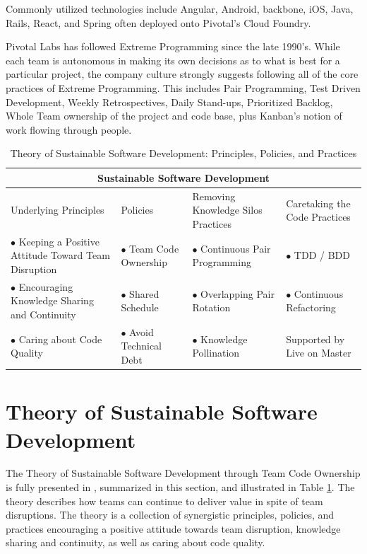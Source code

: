 Commonly utilized technologies include Angular, Android, backbone, iOS, Java, Rails, React, and Spring often deployed onto Pivotal's Cloud Foundry. 

Pivotal Labs has followed Extreme Programming \cite{ExtremeProgramming2004} since the late 1990's. While each team is autonomous in making its own decisions as to what is best for a particular project, the company culture strongly suggests following all of the core practices of Extreme Programming. This includes Pair Programming, Test Driven Development, Weekly Retrospectives, Daily Stand-ups, Prioritized Backlog, Whole Team ownership of the project and code base, plus Kanban's notion of work flowing through people.


\begin{table}[t]
\renewcommand{\arraystretch}{1.5}
\centering
\caption{Theory of Sustainable Software Development: Principles, Policies, and Practices}
\label{SustainableSoftwareDevelopmentTable}
\begin{tabular}{|p{1.65in}|p{1.35in}|p{1.8in}|p{1.6in}|}
\hline
\multicolumn{4}{|c|}{Sustainable Software Development}                     \\
\hline
Underlying Principles & Policies                  & Removing Knowledge Silos Practices & Caretaking the Code Practices       \\
$\bullet$ Keeping a Positive Attitude Toward Team Disruption & $\bullet$ Team Code Ownership & $\bullet$ Continuous Pair Programming         & $\bullet$  TDD / BDD                   \\
$\bullet$ Encouraging Knowledge Sharing and Continuity & $\bullet$ Shared Schedule           & $\bullet$ Overlapping Pair Rotation & $\bullet$ Continuous Refactoring      \\
$\bullet$ Caring about Code Quality  & $\bullet$ Avoid Technical Debt      & $\bullet$  Knowledge Pollination    & Supported by Live on Master \\ 
\hline
\end{tabular}
\end{table}


\section{Theory of Sustainable Software Development}
\label{SustainableSoftwareDevelopmentTheory}
The Theory of Sustainable Software Development through Team Code Ownership is fully presented in \cite{SustainableSoftwareDevelopment}, summarized in this section, and illustrated in Table \ref{SustainableSoftwareDevelopmentTable}. The theory describes how teams can continue to deliver value in spite of team disruptions. The theory is a collection of synergistic principles, policies, and practices encouraging a positive attitude towards team disruption, knowledge sharing and continuity, as well as caring about code quality. 

